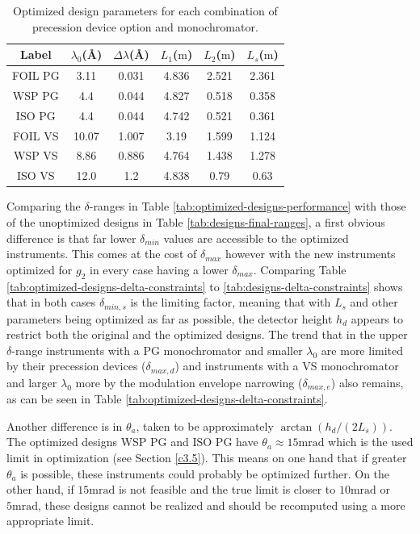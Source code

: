\documentclass{article}
\begin{document}
\begin{table}[h!]
	\centering
	\begin{tabular}{c | c c c c c}
		\toprule
		Label & $\lambda_0$(Å) & $\Delta\lambda$(Å) & $L_1$($\unit{\meter}$) & $L_2$($\unit{\meter}$) & $L_s$($\unit{\meter}$) \\
		\midrule
		FOIL PG & 3.11 & 0.031 & 4.836 & 2.521 & 2.361 \\
		WSP PG & 4.4 & 0.044 & 4.827 & 0.518 & 0.358 \\
		ISO PG & 4.4 & 0.044 & 4.742 & 0.521 & 0.361 \\
		FOIL VS & 10.07 & 1.007 & 3.19 & 1.599 & 1.124 \\
		WSP VS & 8.86 & 0.886 & 4.764 & 1.438 & 1.278 \\
		ISO VS & 12.0 & 1.2 & 4.838 & 0.79 & 0.63 \\
		\bottomrule
	\end{tabular}
	\caption{Optimized design parameters for each combination of precession device option and monochromator. }
	\label{tab:optimized-designs}
\end{table}
Comparing the $\delta$-ranges in Table \ref{tab:optimized-designs-performance} with those of the unoptimized designs in Table \ref{tab:designs-final-ranges}, a first obvious difference is that far lower $\delta_{min}$ values are accessible to the optimized instruments. This comes at the cost of $\delta_{max}$ however with the new instruments optimized for $g_2$ in every case having a lower $\delta_{max}$. Comparing Table \ref{tab:optimized-designs-delta-constraints} to \ref{tab:designs-delta-constraints} shows that in both cases $\delta_{min,s}$ is the limiting factor, meaning that with $L_s$ and other parameters being optimized as far as possible, the detector height $h_d$ appears to restrict both the original and the optimized designs. The trend that in the upper $\delta$-range instruments with a PG monochromator and smaller $\lambda_0$ are more limited by their precession devices ($\delta_{max,d}$) and instruments with a VS monochromator and larger $\lambda_0$ more by the modulation envelope narrowing ($\delta_{max,e}$) also remains, as can be seen in Table \ref{tab:optimized-designs-delta-constraints}.


 Another difference is in $\theta_a$, taken to be approximately $\arctan(h_d/(2L_s))$. The optimized designs WSP PG and ISO PG have $\theta_a \approx 15\unit{\milli\radian}$ which is the used limit in optimization (see Section \ref{c3.5}). This means on one hand that if greater $\theta_a$ is possible, these instruments could probably be optimized further. On the other hand, if $15\unit{\milli\radian}$ is not feasible and the true limit is closer to $10\unit{\milli\radian}$ or $5\unit{\milli\radian}$, these designs cannot be realized and should be recomputed using a more appropriate limit. 
\end{document}
